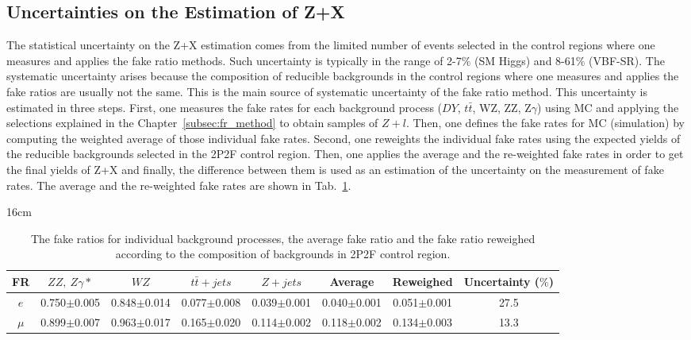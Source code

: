 \subsection{Uncertainties on the Estimation of Z+X}
The statistical uncertainty on the Z+X estimation comes from the limited number of events selected in the control regions where one measures and applies the fake ratio methods. Such uncertainty is typically in the range of 2-7$\%$ (SM Higgs) and 8-61$\%$ (VBF-SR). The systematic uncertainty arises because the composition of reducible backgrounds in the control regions where one measures and applies the fake ratios are usually not the same. This is the main source of systematic uncertainty of the fake ratio method. This uncertainty is estimated in three steps. First, one measures the fake rates for each background process ($DY$, $t\bar{t}$, WZ, ZZ, Z$\gamma$) using MC and applying the selections explained in the Chapter~\ref{subsec:fr_method} to obtain samples of $Z+l$. Then, one defines the fake rates for MC (simulation) by computing the weighted average of those individual fake rates. Second, one reweights the individual fake rates using the expected yields of the reducible backgrounds selected in the 2P2F control region. Then, one applies the average and the re-weighted fake rates in order to get the final yields of Z+X and finally, the difference between them is used as an estimation of the uncertainty on the measurement of fake rates. The average and the re-weighted fake rates are shown in Tab.~\ref{tab:fake_rate_overall_systematic}.

\begin{table}[hbtp]{16cm}
	\centering
	\caption{The fake ratios for individual background processes, the average fake ratio and the fake ratio reweighed according to the composition of backgrounds in 2P2F control region.}
	\scriptsize
	\begin{tabular}{c|c|c|c|c|c|c|c}
		\hline
		\rowcolor{light_gray}
		FR    & $ZZ,~Z\gamma*$  & $WZ$            & $t\bar{t}+jets$ & $Z+jets$        & Average & Reweighed & Uncertainty ($\%$)\\
		\hline
		$e$   & 0.750$\pm$0.005 & 0.848$\pm$0.014 & 0.077$\pm$0.008 & 0.039$\pm$0.001 & 0.040$\pm$0.001 & 0.051$\pm$0.001  & 27.5\\
		$\mu$ & 0.899$\pm$0.007 & 0.963$\pm$0.017 & 0.165$\pm$0.020 & 0.114$\pm$0.002 & 0.118$\pm$0.002 & 0.134$\pm$0.003  & 13.3\\
		\hline
	\end{tabular}
	\label{tab:fake_rate_overall_systematic}	
\end{table}


